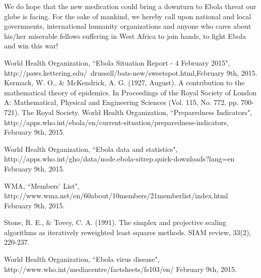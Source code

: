 \documentclass[12pt,a4paper,titlepage]{article}
\begin{document}
We do hope that the new medication could bring a downturn to Ebola threat our globe is facing. For the sake of mankind, we hereby call upon national and local governments, international humanity organizations and anyone who cares about his/her miserable fellows suffering in West Africa to join hands, to fight Ebola and win this war!
\newpage
\begin{thebibliography}{99}

 World Health Organization, ``Ebola Situation Report - 4 February 2015",\\http://paws.kettering.edu/~drussell/bats-new/sweetspot.html,February 9th, 2015.
 Kermack, W. O., \& McKendrick, A. G. (1927, August). A contribution to the mathematical theory of epidemics. In Proceedings of the Royal Society of London A: Mathematical, Physical and Engineering Sciences (Vol. 115, No. 772, pp. 700-721). The Royal Society.
 World Health Organization, ``Preparedness Indicators",\\http://apps.who.int/ebola/en/current-situation/preparedness-indicators, February 9th, 2015.

 World Health Organization, ``Ebola data and statistics",\\http://apps.who.int/gho/data/node.ebola-sitrep.quick-downloads?lang=en February 9th, 2015.

 WMA, ``Members' List",\\http://www.wma.net/en/60about/10members/21memberlist/index.html February 9th, 2015.

 Stone, R. E., \& Tovey, C. A. (1991). The simplex and projective scaling algorithms as iteratively reweighted least squares methods. SIAM review, 33(2), 220-237.

 World Health Organization, ``Ebola virus disease",\\http://www.who.int/mediacentre/factsheets/fs103/en/ February 9th, 2015.


\end{thebibliography}
\end{document}
